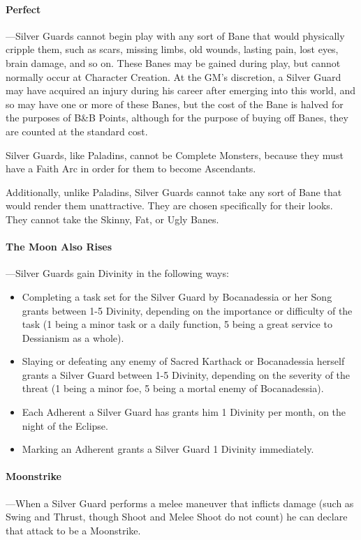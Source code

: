 \documentclass[oneside,11pt,english]{book}
\begin{document}
\paragraph{Perfect}
---\quad Silver Guards cannot begin play with any sort of Bane that would physically cripple them, such 
as scars, missing limbs, old wounds, lasting pain, lost eyes, brain damage, and so on. These Banes 
may be gained during play, but cannot normally occur at Character Creation. At the GM's 
discretion, a Silver Guard may have acquired an injury during his career after emerging into this 
world, and so may have one or more of these Banes, but the cost of the Bane is halved for the 
purposes of B\&B Points, although for the purpose of buying off Banes, they are counted at the 
standard cost. 


Silver Guards, like Paladins, cannot be Complete Monsters, because they must have a Faith Arc
in order for them to become Ascendants. 


Additionally, unlike Paladins, Silver Guards cannot take any sort of Bane that
would render them unattractive. They are chosen specifically for their looks.
They cannot take the Skinny, Fat, or Ugly Banes.  
\paragraph{The Moon Also Rises}
---\quad Silver Guards gain Divinity in the following ways: 
\begin{itemize}
\item Completing a task set for the Silver Guard by Bocanadessia or her Song grants between 
  1-5 Divinity, depending on the importance or difficulty of the task (1 being a minor task 
  or a daily function, 5 being a great service to Dessianism as a whole). 
\item Slaying or defeating any enemy of Sacred Karthack or Bocanadessia herself grants a 
  Silver Guard between 1-5 Divinity, depending on the severity of the threat (1 being a 
  minor foe, 5 being a mortal enemy of Bocanadessia). 
\item Each Adherent a Silver Guard has grants him 1 Divinity per month, on the night of the 
  Eclipse. 
\item Marking an Adherent grants a Silver Guard 1 Divinity immediately. 
\end{itemize}
\paragraph{Moonstrike}
---\quad When a Silver Guard performs a melee maneuver that inflicts damage (such as Swing and Thrust, 
though Shoot and Melee Shoot do not count) he can declare that attack to be a Moonstrike. 
\end{document}
